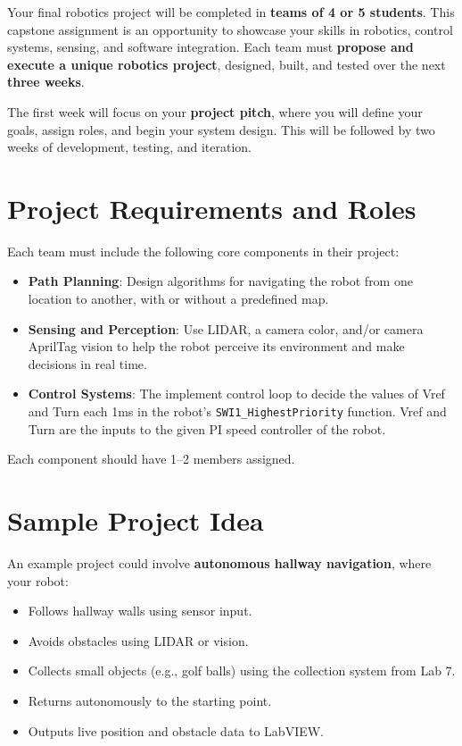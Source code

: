 \documentclass[11pt]{article}
\begin{document}
\MakeAssignmentTitle

Your final robotics project will be completed in \textbf{teams of 4 or 5 students}. This capstone assignment is an opportunity to showcase your skills in robotics, control systems, sensing, and software integration. Each team must \textbf{propose and execute a unique robotics project}, designed, built, and tested over the next \textbf{three weeks}.

The first week will focus on your \textbf{project pitch}, where you will define your goals, assign roles, and begin your system design. This will be followed by two weeks of development, testing, and iteration.

\section*{Project Requirements and Roles}

Each team must include the following core components in their project:
%
\begin{itemize}
    \item \textbf{Path Planning}: Design algorithms for navigating the robot from one location to another, with or without a predefined map.
    \item \textbf{Sensing and Perception}: Use LIDAR, a camera color, and/or camera AprilTag vision to help the robot perceive its environment and make decisions in real time.
        \item \textbf{Control Systems}: The implement control loop to decide the values of Vref and Turn each 1ms in the robot’s \texttt{SWI1_HighestPriority} function. Vref and Turn are the inputs to the given PI speed controller of the robot.
\end{itemize}
%
Each component should have 1–2 members assigned.

\section*{Sample Project Idea}

An example project could involve \textbf{autonomous hallway navigation}, where your robot:
%
\begin{itemize}
    \item Follows hallway walls using sensor input.
    \item Avoids obstacles using LIDAR or vision.
    \item Collects small objects (e.g., golf balls) using the collection system from Lab 7.
    \item Returns autonomously to the starting point.
    \item Outputs live position and obstacle data to LabVIEW.
\end{itemize}
\end{document}
